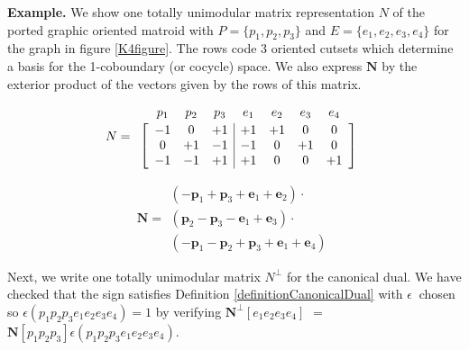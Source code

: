 \documentclass[12pt]{article}
\theoremstyle{definition}
\newcommand{\epsilonfun}{\ensuremath{\epsilon}}
\newcommand{\ext}[1]{\ensuremath{\mathbf{#1}}}
\begin{document}
\textbf{Example.} 
We show one totally unimodular matrix
representation $N$ of the 
ported graphic oriented matroid with $P=\{p_1,p_2,p_3\}$
and $E=\{e_1,e_2,e_3,e_4\}$ for the graph in figure \ref{K4figure}.
The rows code 3 oriented cutsets 
which determine 
a basis for the 1-coboundary (or cocycle) space.  We also
express $\ext{N}$ by the exterior 
product 
of the vectors given by the rows of this matrix.


\[
N=\begin{array}{c}
\begin{array}{ccccccc}
p_1 & p_2 & p_3 & e_1 & e_2 & e_3 & e_4 \\[-1em]
\hphantom{+1} & \hphantom{+1} &\hphantom{+1} &\hphantom{+1} &\hphantom{+1} &\hphantom{+1} &\hphantom{+1} 
\end{array} \\ 
\left[\begin{array}{ccc|cccc}
 -1 &  0  &  +1 & +1  &  +1 &  0  & 0   \\ 
  0 & +1  &  -1 & -1  &   0 & +1  & 0   \\ 
 -1 & -1  &  +1 & +1  &   0 &  0  &+1  
\end{array}\right]
  \end{array}
\]

\[
\ext{N}=
\begin{array}{c}
(-\ext{p}_1+\ext{p}_3+\ext{e}_1+\ext{e}_2)\cdot\\
(\ext{p}_2-\ext{p}_3-\ext{e}_1+\ext{e}_3)\cdot\\
(-\ext{p}_1-\ext{p}_2+\ext{p}_3+\ext{e}_1+\ext{e}_4)
\end{array}
\]

Next, we write one totally unimodular 
matrix $N^\perp$ for the canonical
dual.  We have checked that the sign satisfies Definition 
\ref{definitionCanonicalDual} with
$\epsilonfun\ $ chosen so $\epsilon(p_1p_2p_3e_1e_2e_3e_4)=1$
by verifying 
$\ext{N}^\perp[e_1e_2e_3e_4]$ 
$=$
$\ext{N}[p_1p_2p_3]\epsilon(p_1p_2p_3e_1e_2e_3e_4)$.


\end{document}
